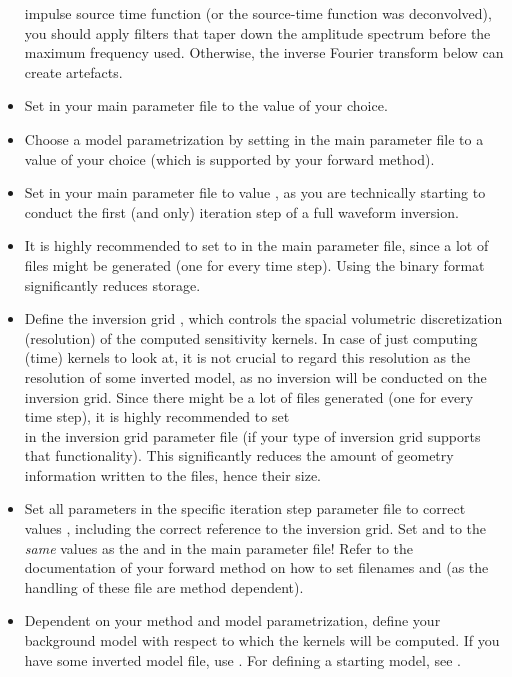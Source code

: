 \begin{itemize}
  impulse source time function (or the source-time function was deconvolved), you should apply filters 
   that taper down the amplitude spectrum before the maximum frequency used. 
  Otherwise, the inverse Fourier transform below can create artefacts.
%
\item Set  in your main parameter file to the value of your choice. 
%
\item Choose a model parametrization by setting  in the main parameter file 
to a value of your choice (which is supported by your forward method).
%
\item Set  in your main parameter file to value , as you are technically
starting to conduct the first (and only) iteration step of a full waveform inversion.
%
\item It is highly recommended to set  to  in the main parameter file, 
  since a lot of  files might be generated (one for every time step). Using the binary format significantly
  reduces storage.

\item Define the inversion grid , which controls the spacial volumetric discretization 
(resolution) of the computed sensitivity kernels. In case of just computing (time) kernels to look at, it is not
crucial to regard this resolution as the resolution of some inverted model, as no inversion will be conducted on the 
inversion grid. Since there might be a lot of  files generated (one for every time step), it is highly recommended to set\\
 in the inversion grid parameter file (if your type of inversion grid
supports that functionality). This significantly reduces the amount of geometry information written to the 
 files, hence their size.
%
\item Set all parameters in the specific iteration step parameter file to correct values 
, including the correct reference to the inversion grid. Set 
 and  to the \emph{same} values as the
 and  in the main parameter file!
Refer to the documentation of your forward method on how to set filenames 
and  (as the handling of these file are method dependent).
%
\item Dependent on your method and model parametrization, define your background model with respect to which the
kernels will be computed. If you have some inverted model file, use . For defining
a starting model, see .
%
\end{itemize}
%
